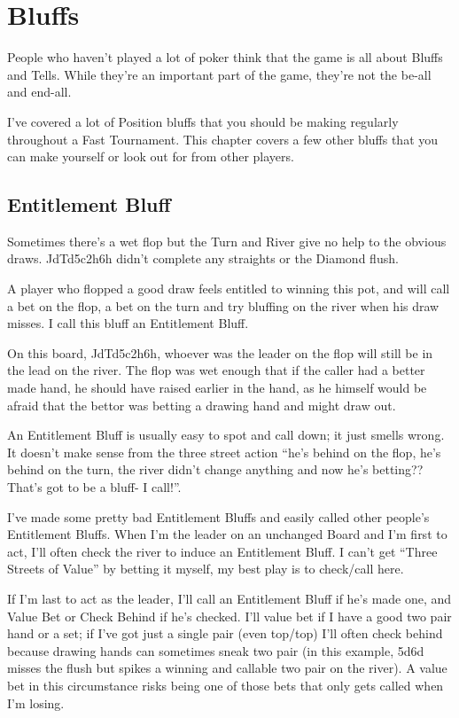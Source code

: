 \chapter{Bluffs}


People who haven't played a lot of poker think that the game
is all about Bluffs and Tells. While they're an important
part of the game, they're not the be-all and end-all.

I've covered a lot of Position bluffs that you should be making
regularly throughout a Fast Tournament. This chapter covers
a few other bluffs that you can make yourself or look out for
from other players.

\section{Entitlement Bluff}

Sometimes there's a wet flop but the Turn and River give no help
to the obvious draws. JdTd5c2h6h didn't complete any straights
or the Diamond flush.


A player who flopped a good draw feels entitled to winning
this pot, and will call a bet on the flop, a bet on the turn
and try bluffing on the river when his draw misses. I call
this bluff an Entitlement Bluff.

On this board, JdTd5c2h6h, whoever was the leader on the flop
will still be in the lead on the river. The flop was wet enough
that if the caller had a better made hand, he should have raised
earlier in the hand, as he himself would be afraid that the bettor
was betting a drawing hand and might draw out.

An Entitlement Bluff is usually easy to spot and call down; it
just smells wrong. It doesn't make sense from the three street action
``he's behind on the flop, he's behind on the turn, the river
didn't change anything and now he's betting?? That's got to be
a bluff- I call!''.

I've made some pretty bad Entitlement Bluffs and easily called
other people's Entitlement Bluffs. When I'm the leader on
an unchanged Board and I'm first to act, I'll often check the
river to induce an Entitlement Bluff. I can't get ``Three Streets
of Value'' by betting it myself, my best play is to check/call here.

If I'm last to act as the leader, I'll call an Entitlement Bluff
if he's made one, and Value Bet or Check Behind if he's checked.
I'll value bet if I have a good two pair hand or a set; if I've
got just a single pair (even top/top) I'll often check behind
because drawing hands can sometimes sneak two pair (in this example,
5d6d misses the flush but spikes a winning and callable two pair
on the river). A value bet in this circumstance risks being one
of those bets that only gets called when I'm losing.

